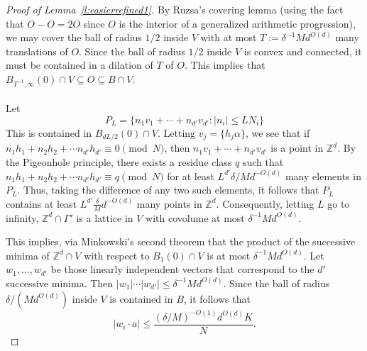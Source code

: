 \documentclass[11pt, a4paper]{amsart}
\theoremstyle{plain}
\theoremstyle{plain}
\theoremstyle{definition}
\theoremstyle{remark}
\numberwithin{equation}{section}
\numberwithin{lemma}{section}
\numberwithin{proposition}{section}
\numberwithin{corollary}{section}
\numberwithin{definition}{section}
\numberwithin{claim}{section}
\begin{document}
\begin{proof}[Proof of Lemma~\ref{l:easierrefined1}]
By Ruzsa's covering lemma (using the fact that $O - O = 2O$ since $O$ is the interior of a generalized arithmetic progression), we may cover the ball of radius $1/2$ inside $V$ with at most $T := \delta^{-1}Md^{O(d)}$ many translations of $O$. Since the ball of radius $1/2$ inside $V$ is convex and connected, it must be contained in a dilation of $T$ of $O$. This implies that $B_{T^{-1}, \infty}(0) \cap V \subseteq O \subseteq B \cap V$.\\\\
Let 
$$P_L = \{n_1v_1 + \cdots + n_{d'} v_{d'}: |n_i| \le LN_i\}$$
This is contained in $B_{dL/2}(0) \cap V$. Letting $v_j = \{h_j \alpha\}$, we see that if $n_1h_1 + n_2h_2 + \cdots n_{d'}h_{d'} \equiv 0 \pmod{N}$, then $n_1v_1 + \cdots + n_{d'}v_{d'}$ is a point in $\mathbb{Z}^{d}$. By the Pigeonhole principle, there exists a residue class $q$ such that $n_1h_1 + n_2h_2 + \cdots n_{d'}h_{d'} \equiv q \pmod{N}$ for at least $L^{d'} \delta/M d^{-O(d)}$ many elements in $P_L$. Thus, taking the difference of any two such elements, it follows that $P_L$ contains at least $L^{d'}\frac{\delta}{M} d^{-O(d)}$ many points in $\mathbb{Z}^{d}$. Consequently, letting $L$ go to infinity, $\mathbb{Z}^{d} \cap \Gamma'$ is a lattice in $V$ with covolume at most $\delta^{-1}M d^{O(d)}$. 

This implies, via Minkowski's second theorem that the product of the successive minima of $\mathbb{Z}^d \cap V$ with respect to $B_1(0) \cap V$ is at most $\delta^{-1} M d^{O(d)}$. Let $w_1, \dots, w_{d'}$ be those linearly independent vectors that correspond to the $d'$ successive minima. Then $|w_1| \cdots |w_{d'}| \le \delta^{-1} M d^{O(d)}$. Since the ball of radius $\delta/(Md^{O(d)})$ inside $V$ is contained in $B$, it follows that
$$|w_i \cdot a| \le \frac{(\delta/M)^{-O(1)}d^{O(d)}K}{N}.$$


\end{proof}
\end{document}

